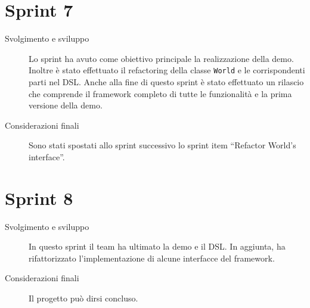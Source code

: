 \section{Sprint 7}\label{sec:sprint-7}
\begin{description}
    \item[Svolgimento e sviluppo] Lo sprint ha avuto come obiettivo principale la realizzazione della demo.
    Inoltre è stato effettuato il refactoring della classe \texttt{World} e le corrispondenti parti nel DSL\@.
    Anche alla fine di questo sprint è stato effettuato un rilascio che comprende il framework completo di tutte le
    funzionalità e la prima versione della demo.
    \item[Considerazioni finali] Sono stati spostati allo sprint successivo lo sprint item ``Refactor World's
    interface''.
\end{description}
\section{Sprint 8}\label{sec:sprint-8}
\begin{description}
    \item[Svolgimento e sviluppo] In questo sprint il team ha ultimato la demo e il DSL. In aggiunta, ha rifattorizzato
    l'implementazione di alcune interfacce del framework.
    \item[Considerazioni finali] Il progetto può dirsi concluso.
\end{description}
